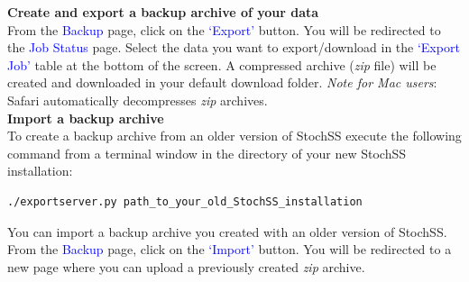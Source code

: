 \textbf{Create and export a backup archive of your data}\\
From the \textcolor{blue}{Backup} page, click on the \textcolor{blue}{`Export'} button. You will be redirected to the \textcolor{blue}{Job Status} page. Select the data you want to export/download in the \textcolor{blue}{`Export Job'} table at the bottom of the screen. A compressed archive (\textit{zip} file) will be created and downloaded in your default download folder. \textit{Note for Mac users}: Safari automatically decompresses \textit{zip} archives.\\

\textbf{Import a backup archive}\\
To create a backup archive from an older version of StochSS execute the following command from a terminal window in the directory of your new StochSS installation:
\begin{verbatim}
./exportserver.py path_to_your_old_StochSS_installation
\end{verbatim}
You can import a backup archive you created with an older version of StochSS. From the \textcolor{blue}{Backup} page, click on the \textcolor{blue}{`Import'} button. You will be redirected to a new page where you can upload a previously created \textit{zip} archive.

